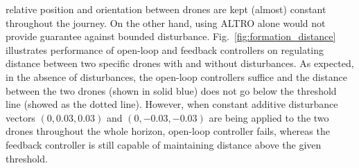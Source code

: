 relative position and orientation between drones are kept (almost) constant 
throughout the journey. 
On the other hand, using ALTRO alone would not provide guarantee against bounded disturbance. 
Fig.~\ref{fig:formation_distance} illustrates performance of open-loop and feedback controllers on regulating distance between two specific 
drones with and without disturbances. 
As expected, in the absence of disturbances, the open-loop controllers suffice and the distance between the two drones 
(shown in solid blue) does not go below the threshold line (showed as the dotted line). 
However, when constant additive disturbance vectors 
$(0 ,0.03,0.03)$ and $(0 ,-0.03,-0.03)$
are being applied to the two drones throughout the whole horizon, open-loop controller fails, 
whereas the feedback controller is still capable of maintaining distance above the given threshold.

